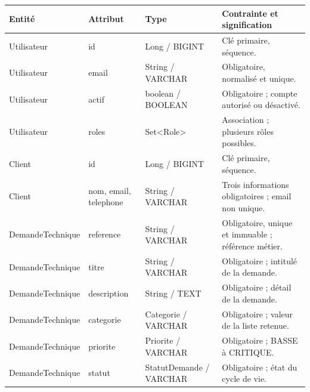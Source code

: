 \begin{center}
\begin{minipage}{\textwidth}
\captionsetup{type=table}
\centering
\caption{Dictionnaire de données synthétique}
\label{tab:02-dictionnaire}
\small
\begingroup
\setlength{\tabcolsep}{4pt}
\setlength{\arrayrulewidth}{0.3pt}
\renewcommand{\arraystretch}{1.08}
\newcommand{\DCell}[1]{{\raggedright #1\par}}
\begin{tabular}{@{}p{}p{}p{}p{}@{}}
\hline
\DCell{\textbf{Entité}} & \DCell{\textbf{Attribut}} & \DCell{\textbf{Type}} & \DCell{\textbf{Contrainte et signification}}\\ \hline
\DCell{Utilisateur} & \DCell{id} & \DCell{Long / BIGINT} & \DCell{Clé primaire, séquence.}\\ \hline
\DCell{Utilisateur} & \DCell{email} & \DCell{String / VARCHAR} & \DCell{Obligatoire, normalisé et unique.}\\ \hline
\DCell{Utilisateur} & \DCell{actif} & \DCell{boolean / BOOLEAN} & \DCell{Obligatoire ; compte autorisé ou désactivé.}\\ \hline
\DCell{Utilisateur} & \DCell{roles} & \DCell{Set\textless Role\textgreater} & \DCell{Association ; plusieurs rôles possibles.}\\ \hline
\DCell{Client} & \DCell{id} & \DCell{Long / BIGINT} & \DCell{Clé primaire, séquence.}\\ \hline
\DCell{Client} & \DCell{nom, email, telephone} & \DCell{String / VARCHAR} & \DCell{Trois informations obligatoires ; email non unique.}\\ \hline
\DCell{DemandeTechnique} & \DCell{reference} & \DCell{String / VARCHAR} & \DCell{Obligatoire, unique et immuable ; référence métier.}\\ \hline
\DCell{DemandeTechnique} & \DCell{titre} & \DCell{String / VARCHAR} & \DCell{Obligatoire ; intitulé de la demande.}\\ \hline
\DCell{DemandeTechnique} & \DCell{description} & \DCell{String / TEXT} & \DCell{Obligatoire ; détail de la demande.}\\ \hline
\DCell{DemandeTechnique} & \DCell{categorie} & \DCell{Categorie / VARCHAR} & \DCell{Obligatoire ; valeur de la liste retenue.}\\ \hline
\DCell{DemandeTechnique} & \DCell{priorite} & \DCell{Priorite / VARCHAR} & \DCell{Obligatoire ; BASSE à CRITIQUE.}\\ \hline
\DCell{DemandeTechnique} & \DCell{statut} & \DCell{StatutDemande / VARCHAR} & \DCell{Obligatoire ; état du cycle de vie.}\\ \hline

\end{tabular}
\end{minipage}
\end{center}
